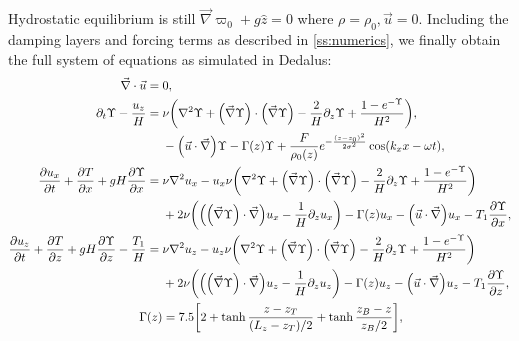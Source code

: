 \documentclass[twocolumn,
        nofootinbib,
        usenames, %
        dvipsnames %
    ]{revtex4-1}%
\newcommand*{\pd}[2]{\frac{\partial#1}{\partial#2}}
\DeclarePairedDelimiter\p{\lparen}{\rparen}
\DeclarePairedDelimiter\s{\lbrack}{\rbrack}
\begin{document}
Hydrostatic equilibrium is still $\vec{\nabla} \varpi_0 + g\hat{z} = 0$ where
$\rho = \rho_0, \vec{u} = 0$. Including the damping layers and forcing terms as
described in \autoref{ss:numerics}, we finally obtain the full system of
equations as simulated in Dedalus:
\begin{subequations}
    \begin{align}
        \vec{\nabla} \cdot \vec{u} ={}& 0,\\
        \partial_t \Upsilon - \frac{u_z}{H}
            ={}& \nu\p*{\nabla^2 \Upsilon + \p*{\vec{\nabla}
            \Upsilon} \cdot \p*{\vec{\nabla}\Upsilon} - \frac{2}{H}\partial_z
            \Upsilon + \frac{1 - e^{-\Upsilon}}{H^2}},\nonumber\\
            & - \p*{\vec{u} \cdot \vec{\nabla}}\Upsilon
                -\Gamma(z) \Upsilon
                + \frac{F}{\rho_0(z)}e^{-\frac{(z - z_0)^2}{2\sigma^2}}
                    \cos \p*{k_xx - \omega t},\\
        \pd{u_x}{t} + \pd{T}{x} + gH\pd{\Upsilon}{x} ={}&
            \nu \nabla^2 u_x
            - u_x \nu\p*{\nabla^2 \Upsilon + \p*{\vec{\nabla} \Upsilon} \cdot
                \p*{\vec{\nabla}\Upsilon} - \frac{2}{H}\partial_z \Upsilon
                + \frac{1 - e^{-\Upsilon}}{H^2}}\nonumber\\
            &+ 2\nu \p*{\p*{\p*{\vec{\nabla}\Upsilon} \cdot \vec{\nabla}}u_x
                - \frac{1}{H}\partial_z u_x}
            -\Gamma(z) u_x
                - \p*{\vec{u} \cdot \vec{\nabla}}u_x
                - T_1 \pd{\Upsilon}{x},\\
        \pd{u_z}{t} + \pd{T}{z} + gH\pd{\Upsilon}{z} - \frac{T_1}{H} ={}&
            \nu \nabla^2 u_z
            - u_z \nu\p*{\nabla^2 \Upsilon + \p*{\vec{\nabla} \Upsilon} \cdot
                \p*{\vec{\nabla}\Upsilon} - \frac{2}{H}\partial_z \Upsilon
                + \frac{1 - e^{-\Upsilon}}{H^2}}\nonumber\\
            &+ 2\nu \p*{\p*{\p*{\vec{\nabla}\Upsilon} \cdot \vec{\nabla}}u_z -
                \frac{1}{H}\partial_z u_{z}}
            -\Gamma(z) u_z - \p*{\vec{u} \cdot \vec{\nabla}}u_z
            - T_1 \pd{\Upsilon}{z},\\
        \Gamma(z) &= 7.5\s*{2 + \tanh \frac{z - z_T}{(L_z - z_T) / 2}
            + \tanh \frac{z_B - z}{z_B / 2}},\label{eq:Gamma}
    \end{align}
\end{subequations}
\end{document}
